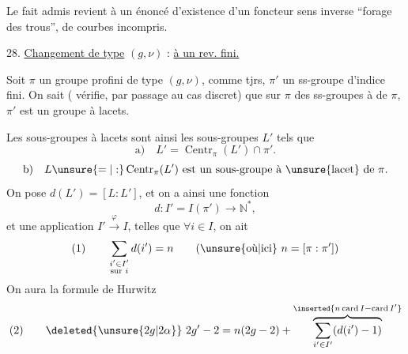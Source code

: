 Le fait admis revient à un énoncé d'existence d'un foncteur  sens inverse ``forage des trous'',     de courbes  incompris.



28. \uline{Changement de type} $(g,\nu)$  : \uline{ à un rev. fini.}

Soit $\pi$ un groupe profini  de type $(g,\nu)$,  comme tjrs, $\pi'$ un ss-groupe d'indice fini. On sait ( vérifie, par passage au cas discret) que    sur $\pi$ des ss-groupes à  de $\pi$, $\pi'$ est un groupe à lacets.


Les sous-groupes à lacets sont ainsi les  sous-groupes $L'$ tels que
\[
\text{a)}\quad L'=\operatorname{Centr}_{\pi}(L')\cap\pi'.
\]
\[
\text{b)}\quad L\unsure{=|:}\operatorname{Centr}_{\pi}(L')\text{ est un sous-groupe à \unsure{lacet} de }\pi.
\]
On pose $d(L')=[L:L']$, et on a ainsi une fonction
\[
d:I'=I(\pi')\longrightarrow\mathbb N^*,
\]
et une application $I'\xrightarrow{\varphi}I$, telles que $\forall i\in I$, on ait
\[
\text{(1)}\qquad \sum_{\substack{i'\in I'\\\text{sur }i}}d(i')=n
\qquad (\text{\unsure{où|ici}}\ n=[\pi:\pi'])
\]
On aura la formule de Hurwitz
\[
\text{(2)}\qquad \deleted{\unsure{2g|2\alpha}}\ 2g'-2=n(2g-2)+\overbrace{\sum_{i'\in I'}(d(i')-1)}^{\inserted{n\operatorname{card}I-\operatorname{card}I'}}
\]
